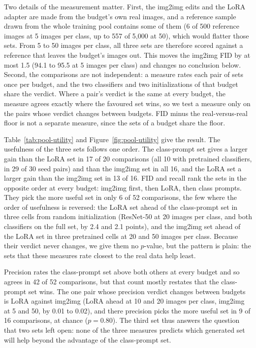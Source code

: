 Two details of the measurement matter. First, the img2img edits and the LoRA adapter are made from the
budget's own real images, and a reference sample drawn from the whole training pool contains some of them
(6 of 500 reference images at 5 images per class, up to 557 of 5,000 at 50), which would flatter those sets.
From 5 to 50 images per class, all three sets are therefore scored against a reference that leaves the
budget's images out. This moves the img2img FID by at most 1.5 (94.1 to 95.5 at 5 images per class) and
changes no conclusion below. Second, the comparisons are not independent: a measure rates each pair of
sets once per budget, and the two classifiers and two initializations of that budget share the verdict.
Where a pair's verdict is the same at every budget, the measure agrees exactly where the favoured set wins,
so we test a measure only on the pairs whose verdict changes between budgets. FID minus the
real-versus-real floor is not a separate measure, since the sets of a budget share the floor.

Table~\ref{tab:pool-utility} and Figure~\ref{fig:pool-utility} give the result. The usefulness of the three
sets follows one order. The class-prompt set gives a larger gain than the LoRA set in 17 of 20 comparisons
(all 10 with pretrained classifiers, in 29 of 30 seed pairs) and than the img2img set in all 16, and the
LoRA set a larger gain than the img2img set in 13 of 16. FID and recall rank the sets in the opposite order
at every budget: img2img first, then LoRA, then class prompts. They pick the more useful set in only 6 of 52
comparisons, the few where the order of usefulness is reversed: the LoRA set ahead of the class-prompt set
in three cells from random initialization (ResNet-50 at 20 images per class, and both classifiers on the
full set, by 2.4 and 2.1 points), and the img2img set ahead of the LoRA set in three pretrained cells at 20
and 50 images per class. Because their verdict never changes, we give them no $p$-value, but the pattern is
plain: the sets that these measures rate closest to the real data help least.

Precision rates the class-prompt set above both others at every budget and so agrees in 42 of 52
comparisons, but that count mostly restates that the class-prompt set wins. The one pair whose precision
verdict changes between budgets is LoRA against img2img (LoRA ahead at 10 and 20 images per class, img2img
at 5 and 50, by 0.01 to 0.02), and there precision picks the more useful set in 9 of 16 comparisons, at
chance ($p = 0.80$). The third set thus answers the question that two sets left open: none of the three
measures predicts which generated set will help beyond the advantage of the class-prompt set.

